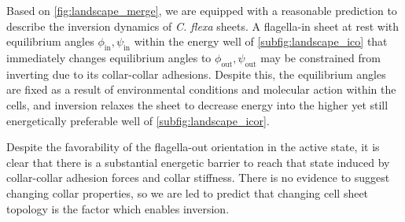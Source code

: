 Based on \cref{fig:landscape_merge}, we are equipped with a reasonable prediction to describe the inversion dynamics of \textit{C. flexa} sheets.
A flagella-in sheet at rest with equilibrium angles $\phi_{\text{in}}, \psi_{\text{in}}$ within the energy well of \cref{subfig:landscape_ico} that immediately changes equilibrium angles to $\phi_{\text{out}}, \psi_{\text{out}}$ may be constrained from inverting due to its collar-collar adhesions.
Despite this, the equilibrium angles are fixed as a result of environmental conditions and molecular action within the cells, and inversion relaxes the sheet to decrease energy into the higher yet still energetically preferable well of \cref{subfig:landscape_icor}. 

Despite the favorability of the flagella-out orientation in the active state, it is clear that there is a substantial energetic barrier to reach that state induced by collar-collar adhesion forces and collar stiffness. 
There is no evidence to suggest changing collar properties, so we are led to predict that changing cell sheet topology is the factor which enables inversion.




